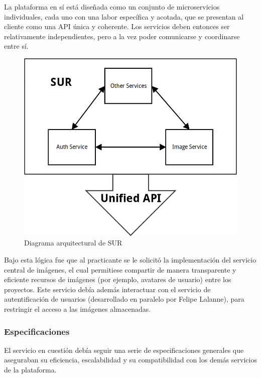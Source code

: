 \documentclass[11pt,letterpaper]{article}
\begin{document}
La plataforma en sí está diseñada como un conjunto de microservicios individuales, cada uno con una labor específica y acotada, que se presentan al cliente como una API única y coherente. Los servicios deben entonces ser relativamente independientes, pero a la vez poder comunicarse y coordinarse entre sí.

\begin{figure}[ht!]
\centering
\includegraphics[scale=0.5]{img/diagrama_SUR.png}
\caption{Diagrama arquitectural de SUR}\label{sur}
\end{figure}


Bajo esta lógica fue que al practicante se le solicitó la implementación del servicio central de imágenes, el cual permitiese compartir de manera transparente y eficiente recursos de imágenes (por ejemplo, avatares de usuario) entre los proyectos. Este servicio debía además interactuar con el servicio de autentificación de usuarios (desarrollado en paralelo por Felipe Lalanne), para restringir el acceso a las imágenes almacenadas.
\pagebreak
\subsubsection{Especificaciones}

El servicio en cuestión debía seguir una serie de especificaciones generales que aseguraban su eficiencia, escalabilidad y su compatibilidad con los demás servicios de la plataforma.
\end{document}
